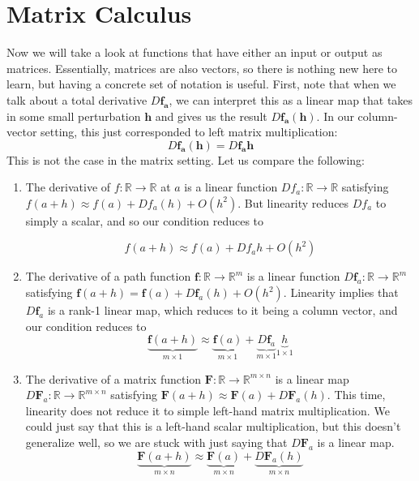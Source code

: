 \documentclass{article}
\theoremstyle{remark}
\theoremstyle{definition}
\begin{document}
\section{Matrix Calculus}
Now we will take a look at functions that have either an input or output as matrices. Essentially, matrices are also vectors, so there is nothing new here to learn, but having a concrete set of notation is useful. First, note that when we talk about a total derivative $D \mathbf{f}_\mathbf{a}$, we can interpret this as a linear map that takes in some small perturbation $\mathbf{h}$ and gives us the result $D \mathbf{f}_\mathbf{a} (\mathbf{h})$. In our column-vector setting, this just corresponded to left matrix multiplication: 
\[D \mathbf{f}_\mathbf{a} (\mathbf{h}) = D \mathbf{f}_\mathbf{a} \mathbf{h}\]
This is not the case in the matrix setting. Let us compare the following: 
\begin{enumerate}
    \item The derivative of $f: \mathbb{R} \rightarrow \mathbb{R}$ at $a$ is a linear function $D f_a: \mathbb{R} \longrightarrow \mathbb{R}$ satisfying $f(a + h) \approx f(a) + D f_a (h) + O(h^2)$. But linearity reduces $D f_a$ to simply a scalar, and so our condition reduces to 
    
    \[f(a + h) \approx f(a) + D f_a h + O(h^2)\]
    
    \item The derivative of a path function $\mathbf{f}: \mathbb{R} \rightarrow \mathbb{R}^m$ is a linear function $D \mathbf{f}_a : \mathbb{R} \longrightarrow \mathbb{R}^m$ satisfying $\mathbf{f}(a + h) = \mathbf{f}(a) + D \mathbf{f}_a (h) + O(h^2)$. Linearity implies that $D \mathbf{f}_a$ is a rank-1 linear map, which reduces to it being a column vector, and our condition reduces to 
    \[\underbrace{\mathbf{f}(a + h)}_{m \times 1} \approx \underbrace{\mathbf{f}(a)}_{m \times 1} + \underbrace{D \mathbf{f}_a}_{m \times 1} \underbrace{h}_{1 \times 1}\]
    
    \item The derivative of a matrix function $\mathbf{F}: \mathbb{R} \rightarrow \mathbb{R}^{m \times n}$ is a linear map $D \mathbf{F}_a: \mathbb{R} \longrightarrow \mathbb{R}^{m \times n}$ satisfying $\mathbf{F}(a + h) \approx \mathbf{F}(a) + D \mathbf{F}_a (h)$. This time, linearity does not reduce it to simple left-hand matrix multiplication. We could just say that this is a left-hand scalar multiplication, but this doesn't generalize well, so we are stuck with just saying that $D \mathbf{F}_a$ is a linear map. 
    \[\underbrace{\mathbf{F}(a + h)}_{m \times n} \approx \underbrace{\mathbf{F}(a)}_{m \times n} + \underbrace{D \mathbf{F}_a (h)}_{m \times n}\]
\end{enumerate}
\end{document}
